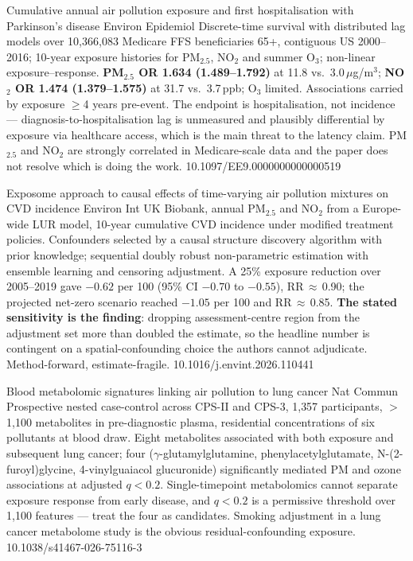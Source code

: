 \documentclass[10pt]{article}
\begin{document}

{Cumulative annual air pollution exposure and first hospitalisation with Parkinson's disease}
{Environ Epidemiol}
{Discrete-time survival with distributed lag models over 10{,}366{,}083 Medicare FFS
beneficiaries 65+, contiguous US 2000--2016; 10-year exposure histories for PM$_{2.5}$,
NO$_2$ and summer O$_3$; non-linear exposure--response. \textbf{PM$_{2.5}$ OR 1.634
(1.489--1.792)} at 11.8 vs.\ 3.0\,$\mu$g/m$^3$; \textbf{NO$_2$ OR 1.474 (1.379--1.575)}
at 31.7 vs.\ 3.7\,ppb; O$_3$ limited. Associations carried by exposure $\geq$4 years
pre-event. The endpoint is hospitalisation, not incidence --- diagnosis-to-hospitalisation
lag is unmeasured and plausibly differential by exposure via healthcare access, which is
the main threat to the latency claim. PM$_{2.5}$ and NO$_2$ are strongly correlated in
Medicare-scale data and the paper does not resolve which is doing the work.}
{10.1097/EE9.0000000000000519}


{Exposome approach to causal effects of time-varying air pollution mixtures on CVD incidence}
{Environ Int}
{UK Biobank, annual PM$_{2.5}$ and NO$_2$ from a Europe-wide LUR model, 10-year
cumulative CVD incidence under modified treatment policies. Confounders selected by a
causal structure discovery algorithm with prior knowledge; sequential doubly robust
non-parametric estimation with ensemble learning and censoring adjustment. A 25\%
exposure reduction over 2005--2019 gave $-0.62$ per 100 (95\% CI $-0.70$ to $-0.55$),
RR\,$\approx$\,0.90; the projected net-zero scenario reached $-1.05$ per 100 and
RR\,$\approx$\,0.85. \textbf{The stated sensitivity is the finding}: dropping
assessment-centre region from the adjustment set more than doubled the estimate, so the
headline number is contingent on a spatial-confounding choice the authors cannot
adjudicate. Method-forward, estimate-fragile.}
{10.1016/j.envint.2026.110441}


{Blood metabolomic signatures linking air pollution to lung cancer}
{Nat Commun}
{Prospective nested case-control across CPS-II and CPS-3, 1{,}357 participants,
$>$1{,}100 metabolites in pre-diagnostic plasma, residential concentrations of six
pollutants at blood draw. Eight metabolites associated with both exposure and subsequent
lung cancer; four ($\gamma$-glutamylglutamine, phenylacetylglutamate,
N-(2-furoyl)glycine, 4-vinylguaiacol glucuronide) significantly mediated PM and ozone
associations at adjusted $q<0.2$. Single-timepoint metabolomics cannot separate exposure
response from early disease, and $q<0.2$ is a permissive threshold over 1{,}100 features
--- treat the four as candidates. Smoking adjustment in a lung cancer metabolome study is
the obvious residual-confounding exposure.}
{10.1038/s41467-026-75116-3}
\end{document}

